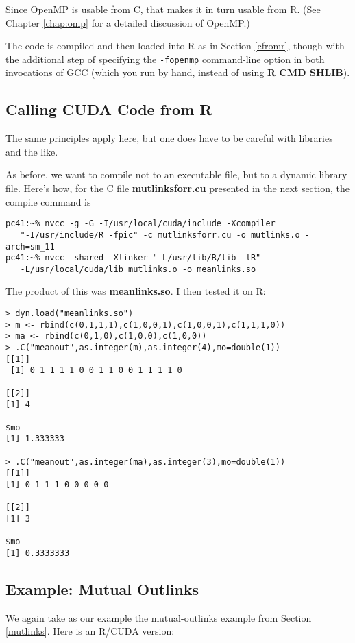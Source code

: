 Since OpenMP is usable from C, that makes it in turn usable from R.
(See Chapter \ref{chap:omp} for a detailed discussion of OpenMP.)

The code is compiled and then loaded into R as in Section
\ref{cfromr}, though with the additional step of specifying the
{\tt -fopenmp} command-line option in both invocations of GCC
(which you run by hand, instead of using {\bf R CMD SHLIB}).

\subsection{Calling CUDA Code from R}

The same principles apply here, but one does have to be careful with
libraries and the like.

As before, we want to compile not to an executable file, but to a dynamic
library file.  Here's how, for the C file {\bf mutlinksforr.cu}
presented in the next section, the compile command is

\begin{lstlisting}
pc41:~% nvcc -g -G -I/usr/local/cuda/include -Xcompiler
   "-I/usr/include/R -fpic" -c mutlinksforr.cu -o mutlinks.o -arch=sm_11
pc41:~% nvcc -shared -Xlinker "-L/usr/lib/R/lib -lR"
   -L/usr/local/cuda/lib mutlinks.o -o meanlinks.so
\end{lstlisting}

The product of this was {\bf meanlinks.so}.  I then tested it on R:

\begin{lstlisting}
> dyn.load("meanlinks.so")
> m <- rbind(c(0,1,1,1),c(1,0,0,1),c(1,0,0,1),c(1,1,1,0))
> ma <- rbind(c(0,1,0),c(1,0,0),c(1,0,0))
> .C("meanout",as.integer(m),as.integer(4),mo=double(1))
[[1]]
 [1] 0 1 1 1 1 0 0 1 1 0 0 1 1 1 1 0

[[2]]
[1] 4

$mo
[1] 1.333333

> .C("meanout",as.integer(ma),as.integer(3),mo=double(1))
[[1]]
[1] 0 1 1 1 0 0 0 0 0

[[2]]
[1] 3

$mo
[1] 0.3333333
\end{lstlisting}

\subsection{Example:  Mutual Outlinks}

We again take as our example the mutual-outlinks example from Section
\ref{mutlinks}.  Here is an R/CUDA version:

